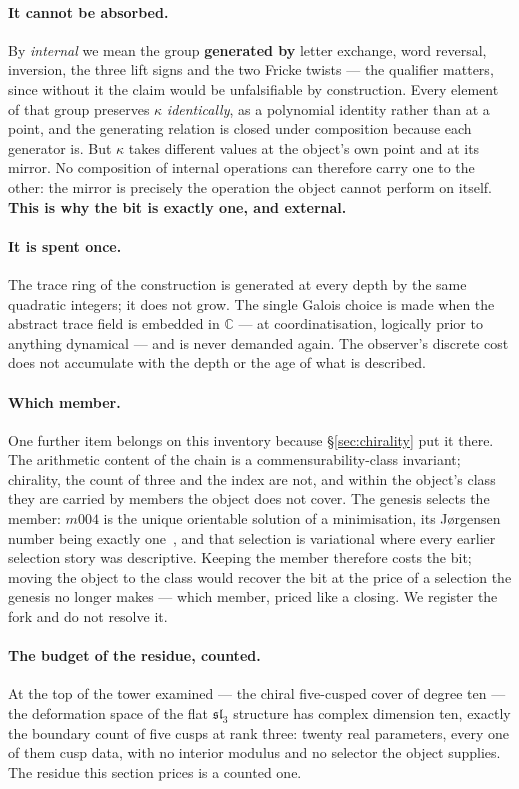 \documentclass[11pt,a4paper]{article}
\theoremstyle{definition}
\theoremstyle{remark}
\begin{document}
\paragraph{It cannot be absorbed.} By \emph{internal} we mean the group \textbf{generated by}
letter exchange, word reversal, inversion, the three lift signs and the two Fricke twists --- the
qualifier matters, since without it the claim would be unfalsifiable by construction. Every element
of that group preserves $\kappa$ \emph{identically}, as a polynomial identity rather than at a
point, and the generating relation is closed under composition because each generator is. But $\kappa$ takes different values at the object's own
point and at its mirror. No composition of internal operations can therefore carry one to the other:
the mirror is precisely the operation the object cannot perform on itself. \textbf{This is why the
bit is exactly one, and external.}

\paragraph{It is spent once.} The trace ring of the construction is generated at every depth by the
same quadratic integers; it does not grow. The single Galois choice is made when the abstract trace
field is embedded in $\mathbb{C}$ --- at coordinatisation, logically prior to anything dynamical ---
and is never demanded again. The observer's discrete cost does not accumulate with the depth or the age of what is described.
\paragraph{Which member.} One further item belongs on this inventory because \S\ref{sec:chirality} put it there. The arithmetic content of the chain is a commensurability-class invariant; chirality, the count of three and the index are not, and within the object's class they are carried by members the object does not cover. The genesis selects the member: $m004$ is the unique orientable solution of a minimisation, its Jørgensen number being exactly one~\cite{jorgensen,callahan}, and that selection is variational where every earlier selection story was descriptive. Keeping the member therefore costs the bit; moving the object to the class would recover the bit at the price of a selection the genesis no longer makes --- which member, priced like a closing. We register the fork and do not resolve it.
\paragraph{The budget of the residue, counted.} At the top of the tower examined --- the chiral five-cusped cover of degree ten --- the deformation space of the flat $\mathfrak{sl}_3$ structure has complex dimension ten, exactly the boundary count of five cusps at rank three: twenty real parameters, every one of them cusp data, with no interior modulus and no selector the object supplies. The residue this section prices is a counted one.
\end{document}
